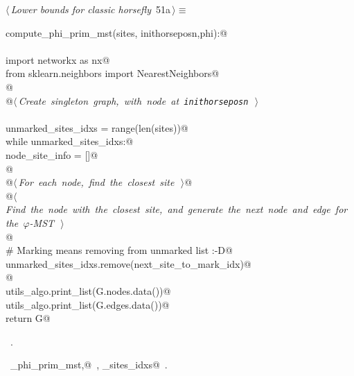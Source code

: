 \documentclass[11.5pt]{report}
\begin{document}
\begin{flushleft} \small\label{scrap74}\raggedright\small
{} $\langle\,${\itshape Lower bounds for classic horsefly}\nobreak\ {\footnotesize {51a}}$\,\rangle\equiv$
\vspace{-1ex}
\begin{list}{}{} \item
\mbox{}\verb@def compute_phi_prim_mst(sites, inithorseposn,phi):@\\
\mbox{}\verb@@\\
\mbox{}\verb@     import networkx as nx@\\
\mbox{}\verb@     from sklearn.neighbors import NearestNeighbors@\\
\mbox{}\verb@     @\\
\mbox{}\verb@     @\hbox{$\langle\,${\itshape Create singleton graph, with node at \verb|inithorseposn|}\nobreak\ {\footnotesize {}}$\,\rangle$}\verb@@\\
\mbox{}\verb@@\\
\mbox{}\verb@     unmarked_sites_idxs = range(len(sites))@\\
\mbox{}\verb@     while unmarked_sites_idxs:@\\
\mbox{}\verb@          node_site_info = []@\\
\mbox{}\verb@          @\\
\mbox{}\verb@          @\hbox{$\langle\,${\itshape For each node, find the closest site}\nobreak\ {\footnotesize {}}$\,\rangle$}\verb@    @\\
\mbox{}\verb@          @\hbox{$\langle\,${\itshape Find the node with the closest site, and generate the next node and edge for the $\varphi$-MST}\nobreak\ {\footnotesize {}}$\,\rangle$}\verb@@\\
\mbox{}\verb@          @\\
\mbox{}\verb@          # Marking means removing from unmarked list :-D@\\
\mbox{}\verb@          unmarked_sites_idxs.remove(next_site_to_mark_idx)@\\
\mbox{}\verb@          @\\
\mbox{}\verb@     utils_algo.print_list(G.nodes.data())@\\
\mbox{}\verb@     utils_algo.print_list(G.edges.data())@\\
\mbox{}\verb@     return G@\\
\mbox{}\verb@@{\NWsep}
\end{list}
\vspace{-1.5ex}
\footnotesize
\begin{list}{}{\setlength{\itemsep}{-\parsep}\setlength{\itemindent}{-\leftmargin}}
\item \NWtxtMacroRefIn\ .
\item \NWtxtIdentsDefed\nobreak\  \verb@compute_phi_prim_mst,@\nobreak\ \NWtxtIdentsNotUsed, \verb@unmarked_sites_idxs@\nobreak\ .
\item{}
\end{list}
\vspace{4ex}
\end{flushleft}
\end{document}
